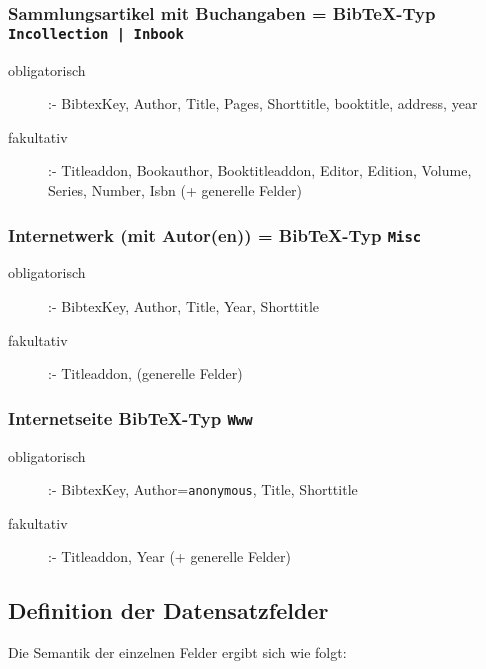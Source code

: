 \subsubsection{Sammlungsartikel mit Buchangaben = Bib\TeX-Typ \texttt{Incollection | Inbook}   }

  \begin{description}
  \item[obligatorisch] :- \textsf{BibtexKey, Author, Title, Pages, Shorttitle, booktitle, address, year}
  \item[fakultativ] :- \textsf{Titleaddon, Bookauthor, Booktitleaddon, Editor, Edition, Volume, Series, Number,  Isbn  (+ generelle Felder)}
  \end{description}  
  

\subsubsection{Internetwerk (mit Autor(en)) = Bib\TeX-Typ \texttt{Misc} }

  \begin{description}
  \item[obligatorisch] :- \textsf{BibtexKey, Author, Title, Year, Shorttitle}
  \item[fakultativ] :- \textsf{Titleaddon, (generelle Felder)}
  \end{description}

\subsubsection{Internetseite Bib\TeX-Typ \texttt{Www} }

  \begin{description}
  \item[obligatorisch] :- \textsf{BibtexKey, Author=\texttt{anonymous}, Title, Shorttitle}
  \item[fakultativ] :-  \textsf{Titleaddon, Year (+ generelle Felder)}
  \end{description}



\subsection{Definition der Datensatzfelder}

Die Semantik der einzelnen Felder ergibt sich wie folgt:

